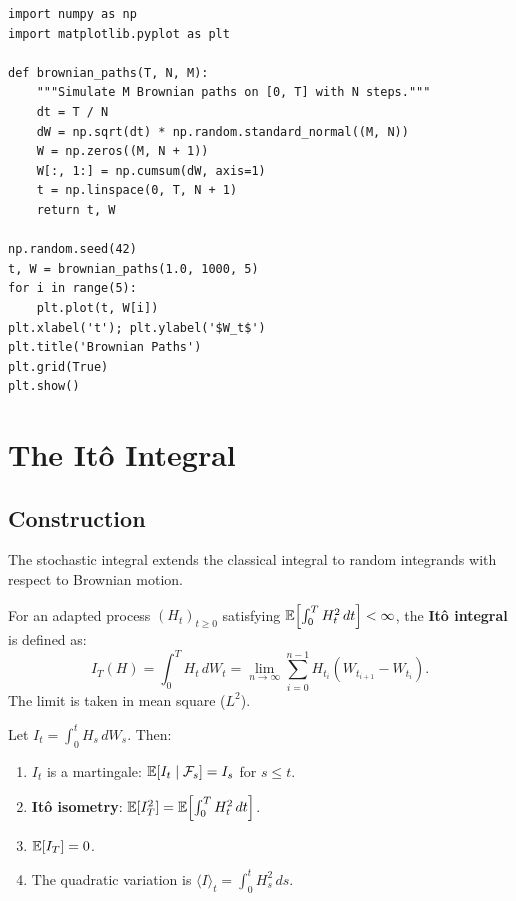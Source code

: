 \begin{codeblock}[title=\textbf{Simulating Brownian Paths}]
\begin{verbatim}
import numpy as np
import matplotlib.pyplot as plt

def brownian_paths(T, N, M):
    """Simulate M Brownian paths on [0, T] with N steps."""
    dt = T / N
    dW = np.sqrt(dt) * np.random.standard_normal((M, N))
    W = np.zeros((M, N + 1))
    W[:, 1:] = np.cumsum(dW, axis=1)
    t = np.linspace(0, T, N + 1)
    return t, W

np.random.seed(42)
t, W = brownian_paths(1.0, 1000, 5)
for i in range(5):
    plt.plot(t, W[i])
plt.xlabel('t'); plt.ylabel('$W_t$')
plt.title('Brownian Paths')
plt.grid(True)
plt.show()
\end{verbatim}
\end{codeblock}

\section{The It\^o Integral}

\subsection{Construction}

The stochastic integral extends the classical integral to random integrands
with respect to Brownian motion.

\begin{definition}[It\^o Integral]
For an adapted process $(H_t)_{t \geq 0}$ satisfying
$\mathbb{E}\!\left[\int_0^T H_t^2\,dt\right] < \infty$, the \textbf{It\^o integral}
is defined as:
\[
    I_T(H) = \int_0^T H_t\,dW_t
           = \lim_{n \to \infty} \sum_{i=0}^{n-1}
             H_{t_i}(W_{t_{i+1}} - W_{t_i}).
\]
The limit is taken in mean square ($L^2$).
\end{definition}

\begin{theorem}
\label{thm:ito_integral_props}
Let $I_t = \int_0^t H_s\,dW_s$. Then:
\begin{enumerate}
    \item $I_t$ is a martingale: $\mathbb{E}[I_t \mid \mathcal{F}_s] = I_s$
          for $s \leq t$.
    \item \textbf{It\^o isometry}:
          $\mathbb{E}[I_T^2] = \mathbb{E}\!\left[\int_0^T H_t^2\,dt\right]$.
    \item $\mathbb{E}[I_T] = 0$.
    \item The quadratic variation is
          $\langle I \rangle_t = \int_0^t H_s^2\,ds$.
\end{enumerate}
\end{theorem}

